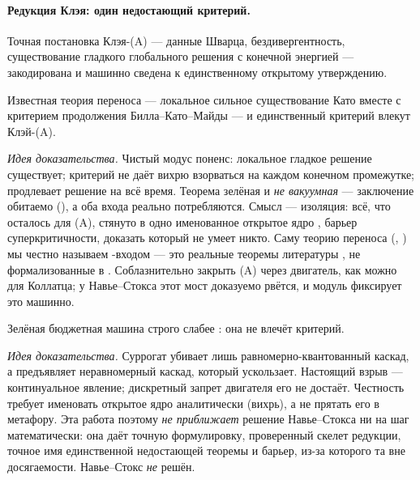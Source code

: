 \paragraph{Редукция Клэя: один недостающий критерий.}
Точная постановка Клэя-(A) --- данные Шварца, бездивергентность, существование гладкого глобального
решения с конечной энергией --- закодирована и машинно сведена к единственному открытому утверждению.

\begin{theorem}\label{thm:clayA_of_regularityTransfer_and_vorticityControl}
Известная теория переноса --- локальное сильное существование Като \cite{kato1984} вместе с
критерием продолжения Билла--Като--Майды \cite{bkm1984} --- и единственный критерий
 влекут Клэй-(A). \green{}
\end{theorem}

\emph{Идея доказательства.} Чистый модус поненс: локальное гладкое решение существует; критерий не
даёт вихрю взорваться на каждом конечном промежутке; \cite{bkm1984} продлевает решение на всё время.
Теорема зелёная и \emph{не вакуумная} --- заключение обитаемо (), а
оба входа реально потребляются. Смысл --- изоляция: всё, что осталось для (A), стянуто в одно
именованное открытое ядро , барьер суперкритичности, доказать который не
умеет никто. Саму теорию переноса (, ) мы честно
называем \red{}-входом --- это реальные теоремы литературы \cite{kato1984,bkm1984}, не формализованные
в . Соблазнительно закрыть (A) через двигатель, как можно для Коллатца; у Навье--Стокса
этот мост доказуемо рвётся, и модуль фиксирует это машинно.

\begin{theorem}\label{thm:greenBudget_strictly_weaker_than_vorticityControl}
Зелёная бюджетная машина строго слабее : она не влечёт критерий. \green{}
\end{theorem}

\emph{Идея доказательства.} Суррогат  убивает лишь равномерно-квантованный
каскад, а  предъявляет неравномерный каскад, который
ускользает. Настоящий взрыв --- континуальное явление; дискретный запрет двигателя его не достаёт.
Честность требует именовать открытое ядро аналитически (вихрь), а не прятать его в метафору. Эта
работа поэтому \emph{не приближает} решение Навье--Стокса ни на шаг математически: она даёт точную
формулировку, проверенный скелет редукции, точное имя единственной недостающей теоремы и барьер,
из-за которого та вне досягаемости. Навье--Стокс \emph{не} решён.

